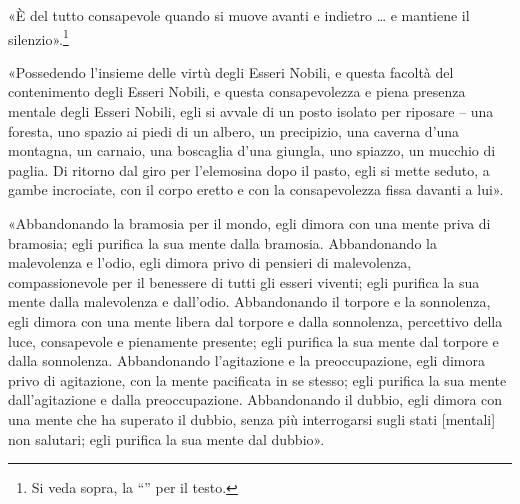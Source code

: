 «È del tutto consapevole quando si muove avanti e indietro … e mantiene
il silenzio».\footnote{Si veda sopra, la “\hyperlink{pag267}{}” per il testo.}


«Possedendo l’insieme delle virtù degli Esseri Nobili, e questa facoltà
del contenimento degli Esseri Nobili, e questa consapevolezza e piena
presenza mentale degli Esseri Nobili, egli si avvale di un posto isolato
per riposare – una foresta, uno spazio ai piedi di un albero, un
precipizio, una caverna d’una montagna, un carnaio, una boscaglia d’una
giungla, uno spiazzo, un mucchio di paglia. Di ritorno dal giro per
l’elemosina dopo il pasto, egli si mette seduto, a gambe incrociate, con
il corpo eretto e con la consapevolezza fissa davanti a lui».


«Abbandonando la bramosia per il mondo, egli dimora con una mente priva
di bramosia; egli purifica la sua mente dalla bramosia. Abbandonando la
malevolenza e l’odio, egli dimora privo di pensieri di malevolenza,
compassionevole per il benessere di tutti gli esseri viventi; egli
purifica la sua mente dalla malevolenza e dall’odio. Abbandonando il
torpore e la sonnolenza, egli dimora con una mente libera dal torpore e
dalla sonnolenza, percettivo della luce, consapevole e pienamente
presente; egli purifica la sua mente dal torpore e dalla sonnolenza.
Abbandonando l’agitazione e la preoccupazione, egli dimora privo di
agitazione, con la mente pacificata in se stesso; egli purifica la sua
mente dall’agitazione e dalla preoccupazione. Abbandonando il dubbio,
egli dimora con una mente che ha superato il dubbio, senza più
interrogarsi sugli stati [mentali] non salutari; egli purifica la sua
mente dal dubbio».




